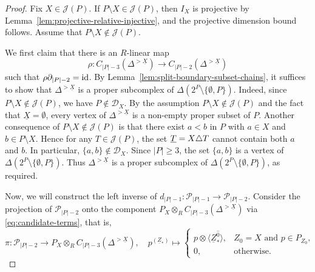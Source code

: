\documentclass[a4paper,leqno]{amsart}
\begin{document}
\begin{proof}
Fix $X\in\mathcal J(P)$. If $P\setminus X\in\mathcal J(P)$, then $I_X$ is projective by Lemma~\ref{lem:projective-relative-injective}, and the projective dimension bound follows. Assume that $P\setminus X\notin\mathcal J(P)$.

\smallskip
\noindent
We first claim that there is an $R$-linear map
\[
\rho:
C_{|P|-3}(\Delta^{>\underline X})
\longrightarrow C_{|P|-2}(\Delta^{>\underline X})
\]
such that $\rho\partial_{|P|-2}=\operatorname{id}$.
By Lemma~\ref{lem:split-boundary-subset-chains}, it suffices to show that $\Delta^{>\underline X}$ is a proper subcomplex of $\Delta(2^P\setminus\{\emptyset,P\})$.  Indeed, since $P\setminus X\notin\mathcal J(P)$, we have $P\notin\mathcal D_X$. 
By the assumption $P\setminus X\notin \mathcal J(P)$ and the fact that $\underline{X}=\emptyset$, every vertex of $\Delta^{>\underline X}$ is a non-empty proper subset of $P$. 
Another consequence of $P\setminus X\notin\mathcal J(P)$ is that there exist $a<b$ in $P$ with $a\in X$ and $b\in P\setminus X$. 
Hence for any $T\in\mathcal J(P)$, the set $\underline{T}=X{\mathbin{\triangle}} T$ cannot contain both $a$ and $b$. 
In particular,  $\{a,b\}\notin\mathcal D_X$.  Since $|P|\geq3$, the set $\{a,b\}$ is a vertex of $\Delta(2^P\setminus\{\emptyset,P\})$. Thus $\Delta^{>\underline X}$ is a proper subcomplex of $\Delta(2^P\setminus\{\emptyset,P\})$, as required.

Now, we will construct the left inverse of $d_{|P|-1}:\mathcal{P}_{|P|-1}\to \mathcal{P}_{|P|-2}$. 
Consider the projection of $\mathcal{P}_{|P|-2}$ onto the component $P_X\otimes_R C_{|P|-3}(\Delta^{> \underline{X}})$ via  \eqref{eq:candidate-terms}, that is,
\[
\pi:\mathcal P_{|P|-2}
\longrightarrow P_X\otimes_R C_{|P|-3}(\Delta^{>\underline X}), \quad p^{(\underline Z_\ast)}\mapsto \begin{cases}
p\otimes\langle\underline Z_*^{\widehat{0}}\rangle,
& Z_0=X \text{ and } p\in P_{Z_0},\\
0,& \text{otherwise}.
\end{cases}
\]


\end{proof}
\end{document}
